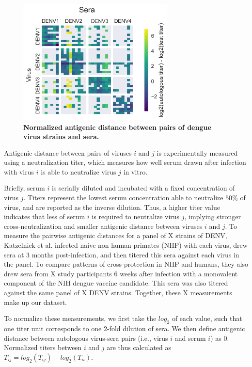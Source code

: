 \documentclass[11pt,oneside,letterpaper]{article}
\begin{document}
\begin{figure}[h]
\begin{centering}
\includegraphics[width=0.7\textwidth]{../figures/png/titer_heatmap.png}
    \caption{\textbf{Normalized antigenic distance between pairs of dengue virus strains and sera.}}
     \label{titer_heatmap}
\end{centering}
\end{figure}


Antigenic distance between pairs of viruses $i$ and $j$ is experimentally measured using a neutralization titer, which measures how well serum drawn after infection with virus $i$ is able to neutralize virus $j$ in vitro.

Briefly, serum $i$ is serially diluted and incubated with a fixed concentration of virus $j$.
Titers represent the lowest serum concentration able to neutralize $50\%$ of virus, and are reported as the inverse dilution.
Thus, a higher titer value indicates that less of serum $i$ is required to neutralize virus $j$, implying stronger cross-neutralization and smaller antigenic distance between viruses $i$ and $j$.
To measure the pairwise antigenic distances for a panel of X strains of DENV, Katzelnick et al. infected naive non-human primates (NHP) with each virus, drew sera at 3 months post-infection, and then titered this sera against each virus in the panel.
To compare patterns of cross-protection in NHP and humans, they also drew sera from X study participants 6 weeks after infection with a monovalent component of the NIH dengue vaccine candidate.
This sera was also titered against the same panel of X DENV strains.
Together, these X measurements make up our dataset.

To normalize these measurements, we first take the $log_2$ of each value, such that one titer unit corresponds to one 2-fold dilution of sera.
We then define antigenic distance between autologous virus-sera pairs (i.e., virus $i$ and serum $i$) as 0.
Normalized titers between $i$ and $j$ are thus calculated as $T_{ij} = log_2(T_{ij}) - log_2(T_{ii})$.
\end{document}
